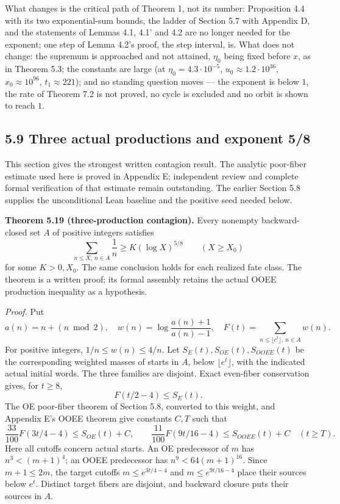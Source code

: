 \documentclass[11pt,a4paper]{article}
\begin{document}
What changes is the critical path of Theorem 1, not its number:
Proposition 4.4 with its two exponential-sum bounds, the ladder of
Section 5.7 with Appendix D, and the statements of Lemmas 4.1, 4.1' and
4.2 are no longer needed for the exponent; one step of Lemma 4.2's
proof, the step interval, is. What does not change: the supremum is
approached and not attained, \(\eta_0\) being fixed before \(x\), as in
Theorem 5.3; the constants are large (at \(\eta_0=4.3\cdot10^{-5}\),
\(u_0\approx1.2\cdot10^{36}\), \(x_0\approx10^{96}\),
\(t_1\approx221\)); and no standing question moves --- the exponent is
below \(1\), the rate of Theorem 7.2 is not proved, no cycle is excluded
and no orbit is shown to reach \(1\).

\subsection{5.9 Three actual productions and exponent
5/8}\label{three-actual-productions-and-exponent-58}

This section gives the strongest written contagion result. The analytic
poor-fiber estimate used here is proved in Appendix E; independent
review and complete formal verification of that estimate remain
outstanding. The earlier Section 5.8 supplies the unconditional Lean
baseline and the positive seed needed below.

\textbf{Theorem 5.19 (three-production contagion).} Every nonempty
backward-closed set \(A\) of positive integers satisfies \[
\sum_{n\le X,\ n\in A}\frac1n\ge K(\log X)^{5/8}
\qquad(X\ge X_0)
\tag{5.11}
\] for some \(K>0,X_0\). The same conclusion holds for each realized
fate class. The theorem is a written proof; its formal assembly retains
the actual OOEE production inequality as a hypothesis.

\emph{Proof.} Put \[
a(n)=n+(n\bmod2),\quad w(n)=\log\frac{a(n)+1}{a(n)-1},\quad
F(t)=\sum_{n\le\lfloor e^t\rfloor,\ n\in A}w(n).
\] For positive integers, \(1/n\le w(n)\le4/n\). Let
\(S_E(t),S_{OE}(t),S_{OOEE}(t)\) be the corresponding weighted masses of
starts in \(A\), below \(\lfloor e^t\rfloor\), with the indicated actual
initial words. The three families are disjoint. Exact even-fiber
conservation gives, for \(t\ge8\), \[
F(t/2-4)\le S_E(t).
\] The OE poor-fiber theorem of Section 5.8, converted to this weight,
and Appendix E's OOEE theorem give constants \(C,T\) such that \[
\frac{33}{100}F(3t/4-4)\le S_{OE}(t)+C,\qquad
\frac{11}{100}F(9t/16-4)\le S_{OOEE}(t)+C
\quad(t\ge T).
\tag{5.12}
\] Here all cutoffs concern actual starts. An OE predecessor of \(m\)
has \(n^3<(m+1)^4\); an OOEE predecessor has \(n^9<64(m+1)^{16}\). Since
\(m+1\le2m\), the target cutoffs \(m\le e^{3t/4-4}\) and
\(m\le e^{9t/16-4}\) place their sources below \(e^t\). Distinct target
fibers are disjoint, and backward closure puts their sources in \(A\).
\end{document}
